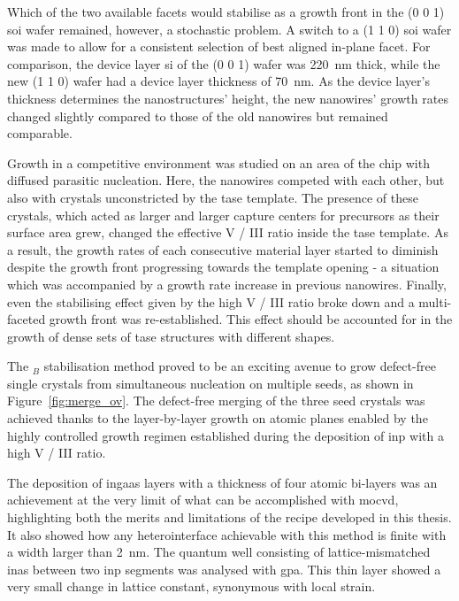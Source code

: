 Which of the two available  facets would stabilise as a growth front in the \hkl(0 0 1) \acf{soi} wafer remained, however, a stochastic problem. A switch to a \hkl(1 1 0) \acs{soi} wafer was made to allow for a consistent selection of best aligned  in-plane facet. For comparison, the device layer \acs{si} of the \hkl(0 0 1) wafer was \qty{220}{\nano\metre} thick, while the new \hkl(1 1 0) wafer had a device layer thickness of \qty{70}{\nano\metre}. As the device layer's thickness determines the nanostructures' height, the new nanowires' growth rates changed slightly compared to those of the old nanowires but remained comparable.

Growth in a competitive environment was studied on an area of the chip with diffused parasitic nucleation. Here, the nanowires competed with each other, but also with crystals unconstricted by the \acs{tase} template. The presence of these crystals, which acted as larger and larger capture centers for precursors as their surface area grew, changed the effective V / III ratio inside the \acs{tase} template. As a result, the growth rates of each consecutive material layer started to diminish despite the growth front progressing towards the template opening - a situation which was accompanied by a growth rate increase in previous nanowires. Finally, even the stabilising effect given by the high V / III ratio broke down and a multi-faceted growth front was re-established. This effect should be accounted for in the growth of dense sets of \acs{tase} structures with different shapes.

The \(_B\) stabilisation method proved to be an exciting avenue to grow defect-free single crystals from simultaneous nucleation on multiple seeds, as shown in Figure~\ref{fig:merge_ov}. The defect-free merging of the three seed crystals was achieved thanks to the layer-by-layer growth on  atomic planes enabled by the highly controlled growth regimen established during the deposition of \acs{inp} with a high V / III ratio.

The deposition of \acs{ingaas} layers with a thickness of four atomic bi-layers was an achievement at the very limit of what can be accomplished with \acf{mocvd}, highlighting both the merits and limitations of the recipe developed in this thesis. It also showed how any heterointerface achievable with this method is finite with a width larger than \qty{2}{\nano\metre}. The quantum well consisting of lattice-mismatched \acf{inas} between two \acs{inp} segments was analysed with \acf{gpa}. This thin layer showed a very small change in lattice constant, synonymous with local strain.

